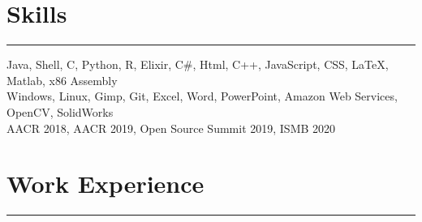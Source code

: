 \documentclass[letterpaper]{resume} %
\newcommand{\colorrule}[1]{%
\begingroup\color{#1}\hrule\endgroup%
}%
\begin{document}
\section{Skills}
\normalfont
\colorrule{black}
\vspace{2 mm}
Java, Shell, C, Python, R, Elixir, C\#, Html, C++, JavaScript, CSS, LaTeX, Matlab, x86 Assembly\\
Windows, Linux, Gimp, Git, Excel, Word, PowerPoint, Amazon Web Services, OpenCV, SolidWorks\\
AACR 2018, AACR 2019, Open Source Summit 2019, ISMB 2020\\

\sectionspace %


\section{Work Experience}
\normalfont
\colorrule{black}
\end{document}
